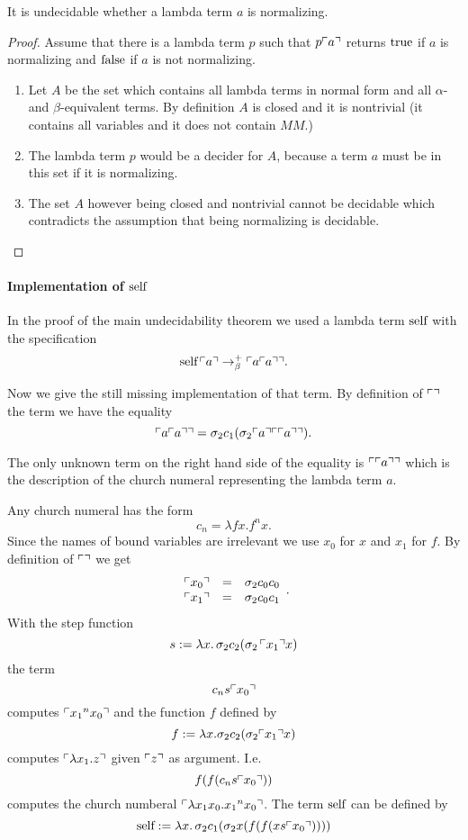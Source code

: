 \begin{theorem}
  It is undecidable whether a lambda term $a$ is normalizing.
  \begin{proof}
    Assume that there is a lambda term $p$ such that $p \ulcorner a \urcorner$ returns
    $\text{true}$ if $a$ is normalizing and $\text{false}$ if $a$ is not normalizing.
    \begin{enumerate}
    \item
      Let $A$ be the set which contains all lambda terms in normal form and
      all $\alpha$- and $\beta$-equivalent terms. By definition $A$ is closed
      and it is nontrivial (it contains all variables and it does not contain
      $M M$.)
    \item
      The lambda term $p$ would be a decider for $A$, because a term $a$ must
      be in this set if it is normalizing.
    \item
      The set $A$ however being closed and nontrivial cannot be decidable
      which contradicts the assumption that being normalizing is decidable.
    \end{enumerate}
  \end{proof}
\end{theorem}




\paragraph{Implementation of $\text{self} $}

In the proof of the main undecidability theorem we used a lambda term $\text{self}$
with the specification
$$ \text{self}\, \ulcorner a \urcorner \to^+_\beta \ulcorner a \ulcorner a \urcorner \urcorner.$$

Now we give the still missing implementation of that term.
By definition of $\ulcorner  \urcorner$ the term we have the equality
$$\ulcorner a \ulcorner a \urcorner \urcorner
= \sigma_2 c_1 (\sigma_2 \ulcorner a \urcorner
\ulcorner \ulcorner a \urcorner \urcorner).$$

The only unknown term on the right hand side of the equality is
$\ulcorner \ulcorner a \urcorner \urcorner$ which is the description of the church numeral
representing the lambda term $a$.

Any church numeral has the form
$$c_n = \lambda f x. f^n x.$$
Since the names of bound variables are irrelevant we use $x_0$ for $x$ and
$x_1$ for $f$.
By definition of $\ulcorner  \urcorner$ we get
$$
\begin{array}{lll}
  \ulcorner x_0 \urcorner &=& \sigma_2 c_0 c_0 \\
  \ulcorner x_1 \urcorner &=& \sigma_2 c_0 c_1
\end{array}.
$$
%
With the step function
$$ s := \lambda x.\, \sigma_2 c_2 (\sigma_2\, \ulcorner x_1 \urcorner x)$$
the term
$$ c_n s \ulcorner x_0 \urcorner$$
computes $\ulcorner {x_1}^n x_0 \urcorner$
and the function $f$ defined by
$$ f:= \lambda x. \sigma_2 c_2 (\sigma_2 \ulcorner x_1 \urcorner x)$$ computes
$\ulcorner \lambda x_1.z \urcorner$ given $\ulcorner z \urcorner$ as argument. I.e.
$$f (f (c_n s \ulcorner x_0 \urcorner))$$
computes the church numberal $\ulcorner \lambda x_1 x_0. {x_1}^n x_0 \urcorner$.
The term $\text{self}$ can be defined by
$$ \text{self} :=
\lambda x.\, \sigma_2 c_1 (\sigma_2 x (f (f (x s \ulcorner x_0 \urcorner))))
$$
